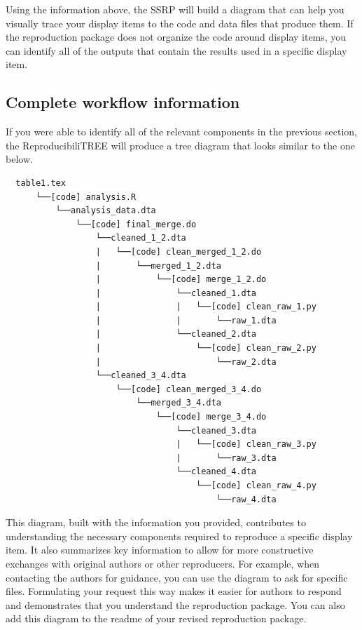 \documentclass[
]{book}
\begin{document}
Using the information above, the SSRP will build a diagram that can help you visually trace your display items to the code and data files that produce them. If the reproduction package does not organize the code around display items, you can identify all of the outputs that contain the results used in a specific display item.

\hypertarget{complete-tree}{%
\subsection{Complete workflow information}\label{complete-tree}}

If you were able to identify all of the relevant components in the previous section, the ReproducibiliTREE will produce a tree diagram that looks similar to the one below.

\begin{verbatim}
  table1.tex
      └──[code] analysis.R
          └──analysis_data.dta
              └──[code] final_merge.do
                  └──cleaned_1_2.dta
                  |   └──[code] clean_merged_1_2.do
                  |       └──merged_1_2.dta
                  |           └──[code] merge_1_2.do
                  |               └──cleaned_1.dta
                  |               |   └──[code] clean_raw_1.py
                  |               |       └──raw_1.dta
                  |               └──cleaned_2.dta
                  |                   └──[code] clean_raw_2.py
                  |                       └──raw_2.dta
                  └──cleaned_3_4.dta
                      └──[code] clean_merged_3_4.do
                          └──merged_3_4.dta
                              └──[code] merge_3_4.do
                                  └──cleaned_3.dta
                                  |   └──[code] clean_raw_3.py
                                  |       └──raw_3.dta
                                  └──cleaned_4.dta
                                      └──[code] clean_raw_4.py
                                          └──raw_4.dta
\end{verbatim}

This diagram, built with the information you provided, contributes to understanding the necessary components required to reproduce a specific display item. It also summarizes key information to allow for more constructive exchanges with original authors or other reproducers. For example, when contacting the authors for guidance, you can use the diagram to ask for specific files. Formulating your request this way makes it easier for authors to respond and demonstrates that you understand the reproduction package. You can also add this diagram to the readme of your revised reproduction package.
\end{document}
